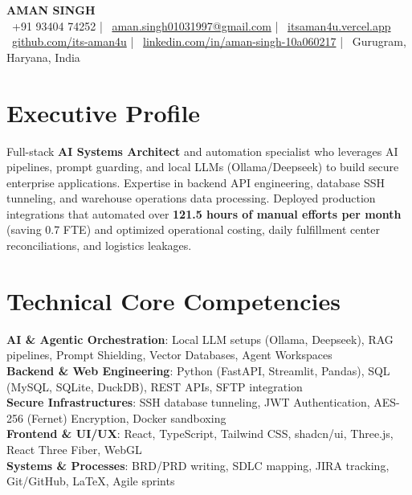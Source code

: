 \documentclass[letterpaper,10pt]{article}
\begin{document}
\begin{center}
    {\Huge \textbf{\color{primaryColor} AMAN SINGH}} \\ \vspace{6pt}
    \small
    \faPhone\ +91 93404 74252 \quad | \quad
    \faEnvelope\ \href{mailto:aman.singh01031997@gmail.com}{aman.singh01031997@gmail.com} \quad | \quad
    \faGlobe\ \href{https://itsaman4u.vercel.app}{itsaman4u.vercel.app} \\ \vspace{3pt}
    \faGithub\ \href{https://github.com/its-aman4u}{github.com/its-aman4u} \quad | \quad
    \faLinkedin\ \href{https://linkedin.com/in/aman-singh-10a060217}{linkedin.com/in/aman-singh-10a060217} \quad | \quad
    \faMapMarker*\ Gurugram, Haryana, India
\end{center}

\section{Executive Profile}
Full-stack \textbf{AI Systems Architect} and automation specialist who leverages AI pipelines, prompt guarding, and local LLMs (Ollama/Deepseek) to build secure enterprise applications. Expertise in backend API engineering, database SSH tunneling, and warehouse operations data processing. Deployed production integrations that automated over \textbf{121.5 hours of manual efforts per month} (saving 0.7 FTE) and optimized operational costing, daily fulfillment center reconciliations, and logistics leakages.

\section{Technical Core Competencies}
\begin{itemize}[leftmargin=0.15in, label={}]
    \small{\item{
     \textbf{AI \& Agentic Orchestration}{: Local LLM setups (Ollama, Deepseek), RAG pipelines, Prompt Shielding, Vector Databases, Agent Workspaces} \\
     \textbf{Backend \& Web Engineering}{: Python (FastAPI, Streamlit, Pandas), SQL (MySQL, SQLite, DuckDB), REST APIs, SFTP integration} \\
     \textbf{Secure Infrastructures}{: SSH database tunneling, JWT Authentication, AES-256 (Fernet) Encryption, Docker sandboxing} \\
     \textbf{Frontend \& UI/UX}{: React, TypeScript, Tailwind CSS, shadcn/ui, Three.js, React Three Fiber, WebGL} \\
     \textbf{Systems \& Processes}{: BRD/PRD writing, SDLC mapping, JIRA tracking, Git/GitHub, LaTeX, Agile sprints}
    }}
\end{itemize}
\end{document}
